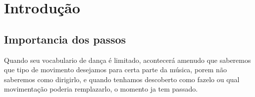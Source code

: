 \chapter{Introdução}

\section{Importancia dos passos}
Quando seu vocabulario de dança é limitado,
acontecerá amenudo que saberemos que tipo de movimento desejamos para certa parte da música,
porem não saberemos como dirigirlo,
e quando tenhamos descoberto como fazelo ou qual movimentação poderia remplazarlo,
o momento ja tem passado.

